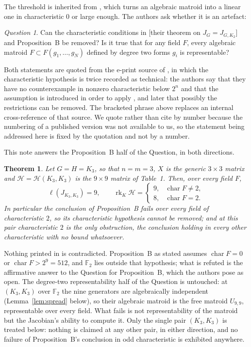 \documentclass[11pt]{amsart}
\newtheorem{theorem}{Theorem}
\theoremstyle{remark}
\newtheorem*{question}{Question}
\DeclareMathOperator{\rk}{rk}
\newcommand{\Hm}{\mathcal H}
\newcommand{\FF}{\mathbb F}
\begin{document}
\noindent
The threshold is inherited from \cite[Theorem 8]{BMS}, which turns an
algebraic matroid into a linear one in characteristic $0$ or large enough. The
authors ask whether it is an artefact:

\begin{question}
Can the characteristic conditions in [their theorem on $J_G=J_{G,K_2}$] and
Proposition~B be removed? Is it true that for any field $F$, every algebraic
matroid $F\subset F(g_1,\ldots,g_N)$ defined by degree two forms $g_i$ is
representable?
\end{question}

\noindent
Both statements are quoted from the e-print source of \cite{LN}, in which the
characteristic hypothesis is twice recorded as technical: the authors say that
they have no counterexample in nonzero characteristic below $2^n$ and that the
assumption is introduced in order to apply \cite[Theorem 8]{BMS}, and later
that possibly the restrictions can be removed. The bracketed phrase above
replaces an internal cross-reference of that source. We quote rather than cite
by number because the numbering of a published version was not available to
us, so the statement being addressed here is fixed by the quotation and not by
a number.

This note answers the Proposition~B half of the Question, in both directions.

\begin{theorem}\label{thm:main}
Let $G=H=K_3$, so that $n=m=3$, $X$ is the generic $3\times3$ matrix and
$\Hm=\Hm(K_3,K_3)$ is the $9\times9$ matrix of Table~\textup{1}. Then, over
every field $F$,
\[
 \ell(J_{K_3,K_3})=9,
 \qquad
 \rk_K\Hm=
 \begin{cases}
  9, & \operatorname{char}F\neq2,\\
  8, & \operatorname{char}F=2.
 \end{cases}
\]
In particular the conclusion of Proposition~B fails over every field of
characteristic $2$, so its characteristic hypothesis cannot be removed; and at
this pair characteristic $2$ is the only obstruction, the conclusion holding in
every other characteristic with no bound whatsoever.
\end{theorem}

Nothing printed in \cite{LN} is contradicted. Proposition~B as stated assumes
$\operatorname{char}F=0$ or $\operatorname{char}F>2^{9}=512$, and $\FF_2$ lies
outside that hypothesis; what is refuted is the affirmative answer to the
Question for Proposition~B, which the authors pose as open. The
degree-two representability half of the Question is untouched: at
$(K_3,K_3)$ over $\FF_2$ the nine generators are algebraically independent
(Lemma~\ref{lem:spread} below), so their algebraic matroid is the free matroid
$U_{9,9}$, representable over every field. What fails is not
representability of the matroid but the Jacobian's ability to compute it.
Only the single pair $(K_3,K_3)$ is treated below: nothing is claimed at any
other pair, in either direction, and no failure of Proposition~B's conclusion
in odd characteristic is exhibited anywhere.
\end{document}
